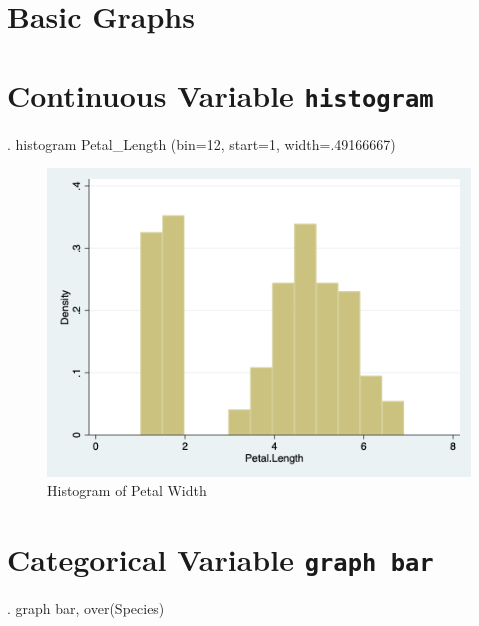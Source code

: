 \documentclass[
]{article}
\begin{document}
\hypertarget{basic-graphs}{%
\section{Basic Graphs}\label{basic-graphs}}

\hypertarget{continuous-variable-histogram}{%
\section{\texorpdfstring{Continuous Variable
\texttt{histogram}}{Continuous Variable histogram}}\label{continuous-variable-histogram}}

\begin{stlog}
. histogram Petal_Length
(bin=12, start=1, width=.49166667)
\end{stlog}



\begin{figure}
\centering
\includegraphics[width=0.75\linewidth]{myhistogram.png}
\caption{Histogram of Petal Width}
\end{figure}

\hypertarget{categorical-variable-graph-bar}{%
\section{\texorpdfstring{Categorical Variable
\texttt{graph\ bar}}{Categorical Variable graph bar}}\label{categorical-variable-graph-bar}}

\begin{stlog}
. graph bar, over(Species)
\end{stlog}
\end{document}
